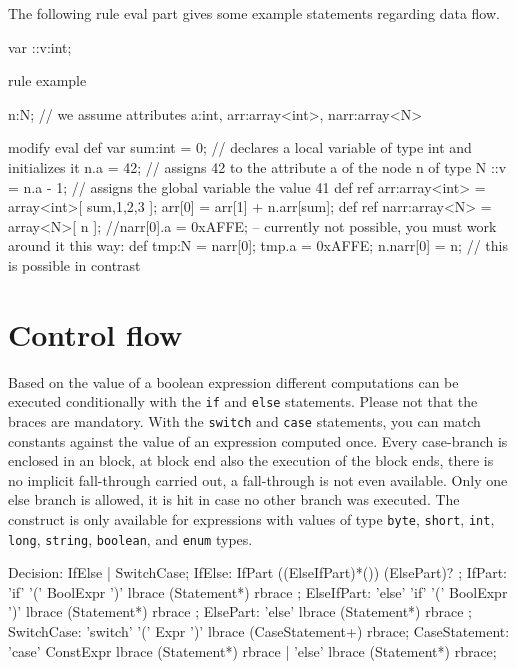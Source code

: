 \begin{example}
The following rule eval part gives some example statements regarding data flow.
  \begin{grgen}
var ::v:int;
	
rule example
{
  n:N; // we assume attributes a:int, arr:array<int>, narr:array<N>
	
	modify {
		eval {
			def var sum:int = 0; // declares a local variable of type int and initializes it
			n.a = 42; // assigns 42 to the attribute a of the node n of type N
			::v = n.a - 1; // assigns the global variable the value 41
			def ref arr:array<int> = array<int>[ sum,1,2,3 ];
			arr[0] = arr[1] + n.arr[sum];
			def ref narr:array<N> = array<N>[ n ];
			//narr[0].a = 0xAFFE; -- currently not possible, you must work around it this way:
			def tmp:N = narr[0];
			tmp.a = 0xAFFE;
			n.narr[0] = n; // this is possible in contrast
		}
	}
}
  \end{grgen}
\end{example}


\section{Control flow} \label{sub:controlflow}

Based on the value of a boolean expression different computations can be executed conditionally with the \texttt{if} and \texttt{else} statements. 
Please not that the braces are mandatory.
With the \texttt{switch} and \texttt{case} statements, you can match constants against the value of an expression computed once.
Every case-branch is enclosed in an block, at block end also the execution of the block ends,
there is no implicit fall-through carried out, a fall-through is not even available.
Only one else branch is allowed, it is hit in case no other branch was executed.
The construct is only available for expressions with values of type \texttt{byte}, \texttt{short}, \texttt{int}, \texttt{long}, \texttt{string}, \texttt{boolean}, and \texttt{enum} types.

\begin{rail} 
  Decision: IfElse | SwitchCase;
  IfElse: IfPart ((ElseIfPart)*()) (ElsePart)? ;
	IfPart: 'if' '(' BoolExpr ')' lbrace (Statement*) rbrace ;
	ElseIfPart: 'else' 'if' '(' BoolExpr ')' lbrace (Statement*) rbrace ;
	ElsePart: 'else' lbrace (Statement*) rbrace ;
	SwitchCase: 'switch' '(' Expr ')' lbrace (CaseStatement+) rbrace;
	CaseStatement: 'case' ConstExpr lbrace (Statement*) rbrace | 'else' lbrace (Statement*) rbrace;
\end{rail}

